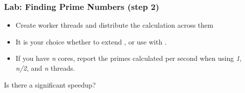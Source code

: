 \begin{slide}
\frametitle{Lab: Finding Prime Numbers (step 2)}
\begin{itemize}
\item Create worker threads and distribute the calculation across them
\item It is your choice whether to extend , or use
 with .
\item If you have \textit{n} cores, report the primes calculated per second when 
using \textit{1}, \textit{n/2}, and \textit{n} threads. 
\end{itemize}
Is there a significant speedup?
\end{slide}



